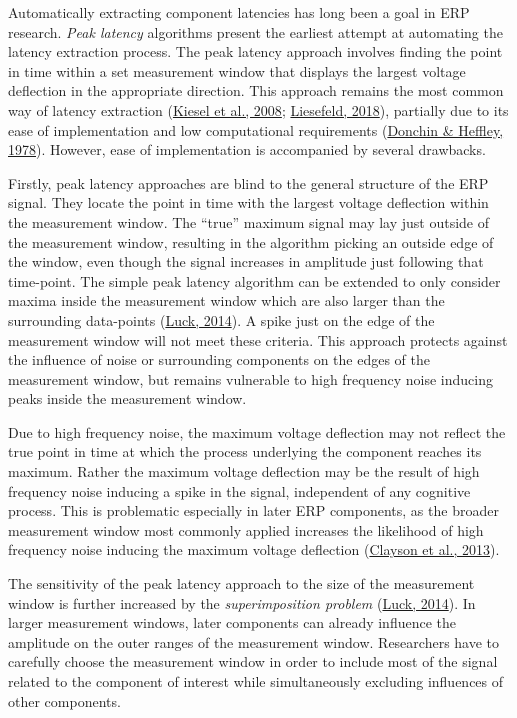 \documentclass[
  man]{apa7}
\begin{document}
Automatically extracting component latencies has long been a goal in ERP research. \emph{Peak latency} algorithms present the earliest attempt at automating the latency extraction process. The peak latency approach involves finding the point in time within a set measurement window that displays the largest voltage deflection in the appropriate direction. This approach remains the most common way of latency extraction (\protect\hyperlink{ref-kiesel2008measurement}{Kiesel et al., 2008}; \protect\hyperlink{ref-liesefeld2018estimating}{Liesefeld, 2018}), partially due to its ease of implementation and low computational requirements (\protect\hyperlink{ref-donchin1978multivariate}{Donchin \& Heffley, 1978}). However, ease of implementation is accompanied by several drawbacks.

Firstly, peak latency approaches are blind to the general structure of the ERP signal. They locate the point in time with the largest voltage deflection within the measurement window. The ``true'' maximum signal may lay just outside of the measurement window, resulting in the algorithm picking an outside edge of the window, even though the signal increases in amplitude just following that time-point. The simple peak latency algorithm can be extended to only consider maxima inside the measurement window which are also larger than the surrounding data-points (\protect\hyperlink{ref-luck2014introduction}{Luck, 2014}). A spike just on the edge of the measurement window will not meet these criteria. This approach protects against the influence of noise or surrounding components on the edges of the measurement window, but remains vulnerable to high frequency noise inducing peaks inside the measurement window.

Due to high frequency noise, the maximum voltage deflection may not reflect the true point in time at which the process underlying the component reaches its maximum. Rather the maximum voltage deflection may be the result of high frequency noise inducing a spike in the signal, independent of any cognitive process. This is problematic especially in later ERP components, as the broader measurement window most commonly applied increases the likelihood of high frequency noise inducing the maximum voltage deflection (\protect\hyperlink{ref-clayson2013noise}{Clayson et al., 2013}).

The sensitivity of the peak latency approach to the size of the measurement window is further increased by the \emph{superimposition problem} (\protect\hyperlink{ref-luck2014introduction}{Luck, 2014}). In larger measurement windows, later components can already influence the amplitude on the outer ranges of the measurement window. Researchers have to carefully choose the measurement window in order to include most of the signal related to the component of interest while simultaneously excluding influences of other components.
\end{document}
